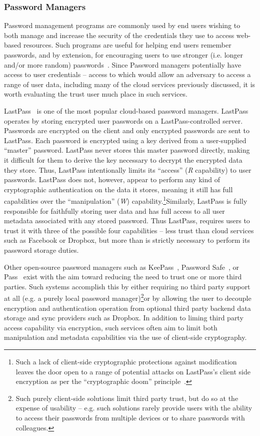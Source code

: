 \subsubsection{Password Managers}

Password management programs are commonly used by end users wishing to
both manage and increase the security of the credentials they use to
access web-based resources. Such programs are useful for helping end
users remember passwords, and by extension, for encouraging users to
use stronger (i.e. longer and/or more random)
passwords~\cite{brodkin-passman, krebs-passwords,
  schneier-passwords}. Since Password managers potentially have access
to user credentials -- access to which would allow an adversary to
access a range of user data, including many of the cloud services
previously discussed, it is worth evaluating the trust user much place
in such services.

LastPass~\cite{lastpass} is one of the most popular cloud-based
password managers. LastPass operates by storing encrypted user
passwords on a LastPass-controlled server. Passwords are encrypted on
the client and only encrypted passwords are sent to LastPass. Each
password is encrypted using a key derived from a user-supplied
``master'' password. LastPass never stores this master password
directly, making it difficult for them to derive the key necessary to
decrypt the encrypted data they store. Thus, LastPass intentionally
limits its ``access'' (\emph{R} capability) to user
passwords. LastPass does not, however, appear to perform any kind of
cryptographic authentication on the data it stores, meaning it still
has full capabilities over the ``manipulation'' (\emph{W})
capability.\footnote{Such a lack of client-side cryptographic
  protections against modification leaves the door open to a range of
  potential attacks on LastPass's client side encryption as per the
  ``cryptographic doom'' principle~\cite{marlinspike-doom}.}Similarly,
LastPass is fully responsible for faithfully storing user data and has
full access to all user metadata associated with any stored
password. Thus LastPass, requires users to trust it with three of the
possible four capabilities -- less trust than cloud services such as
Facebook or Dropbox, but more than is strictly necessary to perform
its password storage duties.

Other open-source password managers such as KeePass~\cite{keepass},
Password Safe~\cite{passwordsafe}, or Pass~\cite{pass} exist with the
aim toward reducing the need to trust one or more third parties. Such
systems accomplish this by either requiring no third party support at
all (e.g. a purely local password manager)\footnote{Such purely
  client-side solutions limit third party trust, but do so at the
  expense of usability -- e.g. such solutions rarely provide users
  with the ability to access their passwords from multiple devices or
  to share passwords with colleagues.}or by allowing the user to
decouple encryption and authentication operation from optional third
party backend data storage and sync providers such as Dropbox. In
addition to liming third party access capability via encryption, such
services often aim to limit both manipulation and metadata
capabilities via the use of client-side cryptography.

